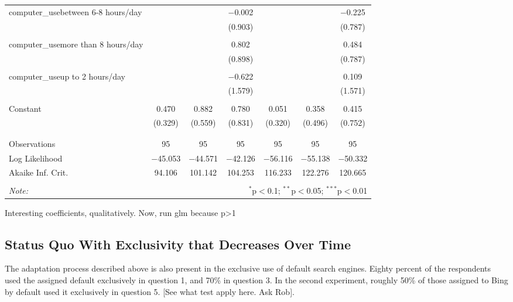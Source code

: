 \documentclass[
  11pt,
]{article}
\begin{document}
\begin{table}
\begin{tabular}{@{\extracolsep{3pt}}lcccccc}
 computer\_usebetween 6-8 hours/day &  &  & $-$0.002 &  &  & $-$0.225 \\ 
  &  &  & (0.903) &  &  & (0.787) \\ 
  & & & & & & \\ 
 computer\_usemore than 8 hours/day &  &  & 0.802 &  &  & 0.484 \\ 
  &  &  & (0.898) &  &  & (0.787) \\ 
  & & & & & & \\ 
 computer\_useup to 2 hours/day &  &  & $-$0.622 &  &  & 0.109 \\ 
  &  &  & (1.579) &  &  & (1.571) \\ 
  & & & & & & \\ 
 Constant & 0.470 & 0.882 & 0.780 & 0.051 & 0.358 & 0.415 \\ 
  & (0.329) & (0.559) & (0.831) & (0.320) & (0.496) & (0.752) \\ 
  & & & & & & \\ 
\hline \\[-1.8ex] 
Observations & 95 & 95 & 95 & 95 & 95 & 95 \\ 
Log Likelihood & $-$45.053 & $-$44.571 & $-$42.126 & $-$56.116 & $-$55.138 & $-$50.332 \\ 
Akaike Inf. Crit. & 94.106 & 101.142 & 104.253 & 116.233 & 122.276 & 120.665 \\ 
\hline 
\hline \\[-1.8ex] 
\textit{Note:}  & \multicolumn{6}{r}{$^{*}$p$<$0.1; $^{**}$p$<$0.05; $^{***}$p$<$0.01} \\ 
\end{tabular} 
\end{table}

\hfill\break
Interesting coefficients, qualitatively. Now, run glm because p\textgreater1

\hypertarget{status-quo-with-exclusivity-that-decreases-over-time}{%
\subsection{Status Quo With Exclusivity that Decreases Over Time}\label{status-quo-with-exclusivity-that-decreases-over-time}}

The adaptation process described above is also present in the exclusive use of default search engines. Eighty percent of the respondents used the assigned default exclusively in question 1, and 70\% in question 3. In the second experiment, roughly 50\% of those assigned to Bing by default used it exclusively in question 5. {[}See what test apply here. Ask Rob{]}.
\end{document}
